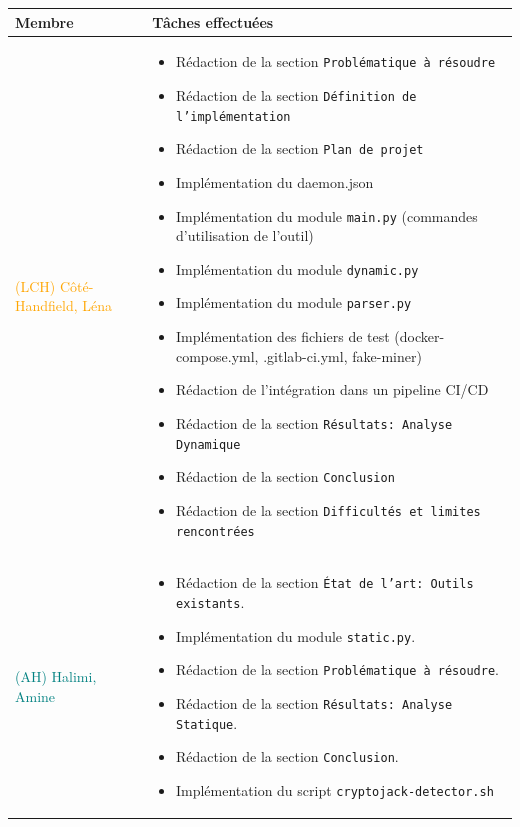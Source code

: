 \begin{table}[H]
    \centering
    \begin{tabularx}{\textwidth}{|l|X|}
        \hline
        \textbf{Membre} & \textbf{Tâches effectuées} \\
        \hline
        \textcolor{orange}{(LCH) Côté-Handfield, Léna} &
        \begin{itemize}
            \item Rédaction de la section \texttt{Problématique à résoudre}
            \item Rédaction de la section \texttt{Définition de l'implémentation}
            \item Rédaction de la section \texttt{Plan de projet}
            \item Implémentation du daemon.json
            \item Implémentation du module \texttt{main.py} (commandes d'utilisation de l'outil)
            \item Implémentation du module \texttt{dynamic.py}
            \item Implémentation du module \texttt{parser.py}
            \item Implémentation des fichiers de test (docker-compose.yml, .gitlab-ci.yml, fake-miner)
            \item Rédaction de l'intégration dans un pipeline CI/CD
            \item Rédaction de la section \texttt{Résultats: Analyse Dynamique}
            \item Rédaction de la section \texttt{Conclusion}
            \item Rédaction de la section \texttt{Difficultés et limites rencontrées}
        \end{itemize} \\
        \hline
        \textcolor{teal}{(AH) Halimi, Amine} & 
        \begin{itemize}
            \item Rédaction de la section \texttt{État de l'art: Outils existants}.
            \item Implémentation du module \texttt{static.py}.
            \item Rédaction de la section \texttt{Problématique à résoudre}.
            \item Rédaction de la section \texttt{Résultats: Analyse Statique}.
            \item Rédaction de la section \texttt{Conclusion}.
            \item Implémentation du script \texttt{cryptojack-detector.sh}

\end{itemize}
\end{tabularx}
\end{table}
